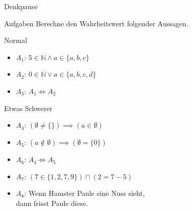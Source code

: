 {
\begin{frame}[fragile]{Denkpause}
	\begin{alertblock}{Aufgaben}
		Berechne den Wahrheitswert folgender Aussagen.
	\end{alertblock}
	\begin{block}{Normal}
		\begin{itemize}
			\item $A_1$: $5 \in \mathbb{N} \wedge a \in \{a, b, c\}$
			\item $A_2$: $0 \in \mathbb{N} \vee a \in \{a, b, c, d\}$
			\item $A_3$: $A_1 \iff A_2$
		\end{itemize}
	\end{block}
	\begin{block}{Etwas Schwerer}
		\begin{itemize}
			\item $A_4$: $(\emptyset\neq \{\}) \implies (a \in \emptyset)$
			\item $A_5$: $(a \notin \emptyset) \implies (\emptyset = \{0\})$
			\item $A_6$: $A_4 \iff A_5$
			\item $A_7$: $(7 \in \{1, 2, 7, 9\}) \cap (2 = 7-5)$
			\item $A_8$: Wenn Hamster Paule eine Nuss sieht,\\
			      \quad dann frisst Paule diese.
		\end{itemize}
	\end{block}
\end{frame}
}


